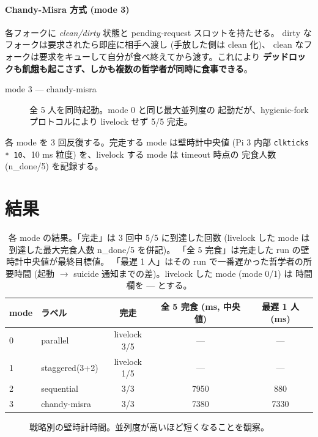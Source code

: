 \documentclass[a4paper,11pt]{ltjsarticle}
\begin{document}
\paragraph{Chandy-Misra 方式 (mode 3)}
各フォークに \emph{clean/dirty} 状態と pending-request スロットを持たせる。
dirty なフォークは要求されたら即座に相手へ渡し (手放した側は clean 化)、
clean なフォークは要求をキューして自分が食べ終えてから渡す。これにより
\textbf{デッドロックも飢餓も起こさず、しかも複数の哲学者が同時に食事できる}。

\begin{description}
  \item[mode 3 — chandy-misra] 全 5 人を同時起動。mode 0 と同じ最大並列度の
        起動だが、hygienic-fork プロトコルにより livelock せず 5/5 完走。
\end{description}

各 mode を 3 回反復する。完走する mode は壁時計中央値 (Pi 3 内部
\texttt{clkticks * 10}、10 ms 粒度) を、livelock する mode は timeout 時点の
完食人数 (n\_done/5) を記録する。

\section{結果}

\begin{table}[h]
\centering
\begin{tabular}{llccc}
\toprule
mode & ラベル & 完走 & 全 5 完食 (ms, 中央値) & 最遅 1 人 (ms) \\
\midrule
0 & parallel & livelock 3/5 & --- & --- \\
1 & staggered(3+2) & livelock 1/5 & --- & --- \\
2 & sequential & 3/3 & 7950 & 880 \\
3 & chandy-misra & 3/3 & 7380 & 7330 \\
\bottomrule
\end{tabular}
\caption{各 mode の結果。「完走」は 3 回中 5/5 に到達した回数
(livelock した mode は到達した最大完食人数 n\_done/5 を併記)。
「全 5 完食」は完走した run の壁時計中央値が最終目標値。
「最遅 1 人」はその run で一番遅かった哲学者の所要時間
(起動 $\to$ suicide 通知までの差)。livelock した mode (mode 0/1) は
時間欄を --- とする。}
\label{tab:dining}
\end{table}

\begin{figure}[h]
\centering
{}
\caption{戦略別の壁時計時間。並列度が高いほど短くなることを観察。}
\label{fig:dining}
\end{figure}
\end{document}

